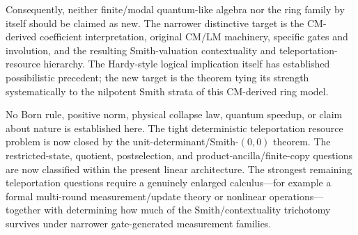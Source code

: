 \documentclass[11pt]{article}
\begin{document}
Consequently, neither finite/modal quantum-like algebra nor the ring family by
itself should be claimed as new.  The narrower distinctive target is the
CM-derived coefficient interpretation, original CM/LM machinery, specific
gates and involution, and the resulting Smith-valuation contextuality and
teleportation-resource hierarchy.  The Hardy-style logical implication itself
has established possibilistic precedent; the new target is the theorem tying
its strength systematically to the nilpotent Smith strata of this CM-derived
ring model.

No Born rule, positive norm, physical collapse law, quantum speedup, or claim
about nature is established here.  The tight deterministic teleportation
resource problem is now closed by the unit-determinant/Smith-$(0,0)$ theorem.
The restricted-state, quotient, postselection, and product-ancilla/finite-copy
questions are now classified within the present linear architecture.  The
strongest remaining teleportation questions require a genuinely enlarged
calculus---for example a formal multi-round measurement/update theory or
nonlinear operations---together with determining how much of the
Smith/contextuality trichotomy survives under narrower gate-generated
measurement families.



\end{document}
